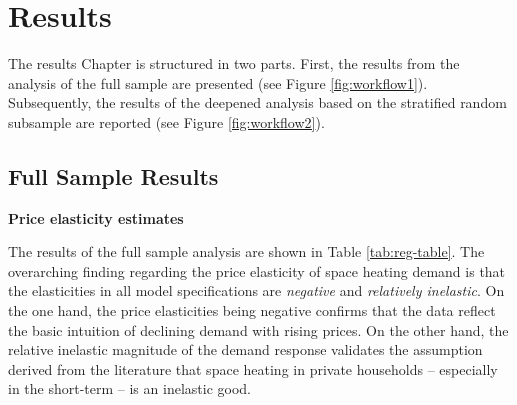 \documentclass[12pt,twoside]{reedthesis}
\begin{document}
\hypertarget{results}{%
\chapter{Results}\label{results}}

The results Chapter is structured in two parts. First, the results from the analysis of the full sample are presented (see Figure \ref{fig:workflow1}). Subsequently, the results of the deepened analysis based on the stratified random subsample are reported (see Figure \ref{fig:workflow2}).

\hypertarget{full-sample-results}{%
\section{Full Sample Results}\label{full-sample-results}}

\textbf{Price elasticity estimates}

The results of the full sample analysis are shown in Table \ref{tab:reg-table}. The overarching finding regarding the price elasticity of space heating demand is that the elasticities in all model specifications are \emph{negative} and \emph{relatively inelastic}. On the one hand, the price elasticities being negative confirms that the data reflect the basic intuition of declining demand with rising prices. On the other hand, the relative inelastic magnitude of the demand response validates the assumption derived from the literature that space heating in private households -- especially in the short-term -- is an inelastic good.
\end{document}
